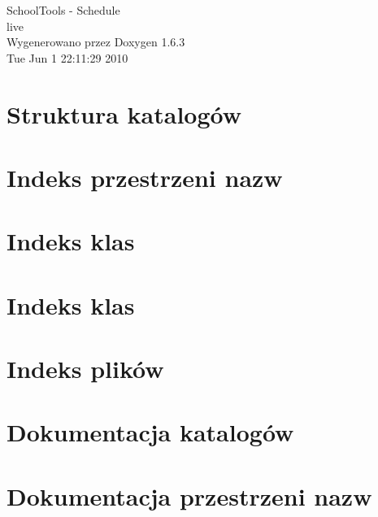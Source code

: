 \documentclass[a4paper]{book}
\begin{document}
\hypersetup{pageanchor=false}
\begin{titlepage}
\vspace*{7cm}
\begin{center}
{\Large SchoolTools -\/ Schedule \\[1ex]\large live }\\
\vspace*{1cm}
{\large Wygenerowano przez Doxygen 1.6.3}\\
\vspace*{0.5cm}
{\small Tue Jun 1 22:11:29 2010}\\
\end{center}
\end{titlepage}
\clearemptydoublepage
{}
\tableofcontents
\clearemptydoublepage
{}
\hypersetup{pageanchor=true}
\chapter{Struktura katalogów}

\chapter{Indeks przestrzeni nazw}

\chapter{Indeks klas}

\chapter{Indeks klas}

\chapter{Indeks plików}

\chapter{Dokumentacja katalogów}








\chapter{Dokumentacja przestrzeni nazw}

\end{document}
